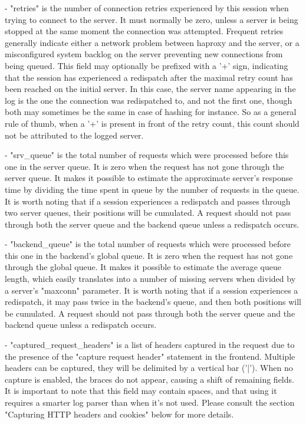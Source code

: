   - "retries" is the number of connection retries experienced by this session
    when trying to connect to the server. It must normally be zero, unless a
    server is being stopped at the same moment the connection was attempted.
    Frequent retries generally indicate either a network problem between
    haproxy and the server, or a misconfigured system backlog on the server
    preventing new connections from being queued. This field may optionally be
    prefixed with a '+' sign, indicating that the session has experienced a
    redispatch after the maximal retry count has been reached on the initial
    server. In this case, the server name appearing in the log is the one the
    connection was redispatched to, and not the first one, though both may
    sometimes be the same in case of hashing for instance. So as a general rule
    of thumb, when a '+' is present in front of the retry count, this count
    should not be attributed to the logged server.

  - "srv_queue" is the total number of requests which were processed before
    this one in the server queue. It is zero when the request has not gone
    through the server queue. It makes it possible to estimate the approximate
    server's response time by dividing the time spent in queue by the number of
    requests in the queue. It is worth noting that if a session experiences a
    redispatch and passes through two server queues, their positions will be
    cumulated. A request should not pass through both the server queue and the
    backend queue unless a redispatch occurs.

  - "backend_queue" is the total number of requests which were processed before
    this one in the backend's global queue. It is zero when the request has not
    gone through the global queue. It makes it possible to estimate the average
    queue length, which easily translates into a number of missing servers when
    divided by a server's "maxconn" parameter. It is worth noting that if a
    session experiences a redispatch, it may pass twice in the backend's queue,
    and then both positions will be cumulated. A request should not pass
    through both the server queue and the backend queue unless a redispatch
    occurs.

  - "captured_request_headers" is a list of headers captured in the request due
    to the presence of the "capture request header" statement in the frontend.
    Multiple headers can be captured, they will be delimited by a vertical bar
    ('|'). When no capture is enabled, the braces do not appear, causing a
    shift of remaining fields. It is important to note that this field may
    contain spaces, and that using it requires a smarter log parser than when
    it's not used. Please consult the section "Capturing HTTP headers and
    cookies" below for more details.

